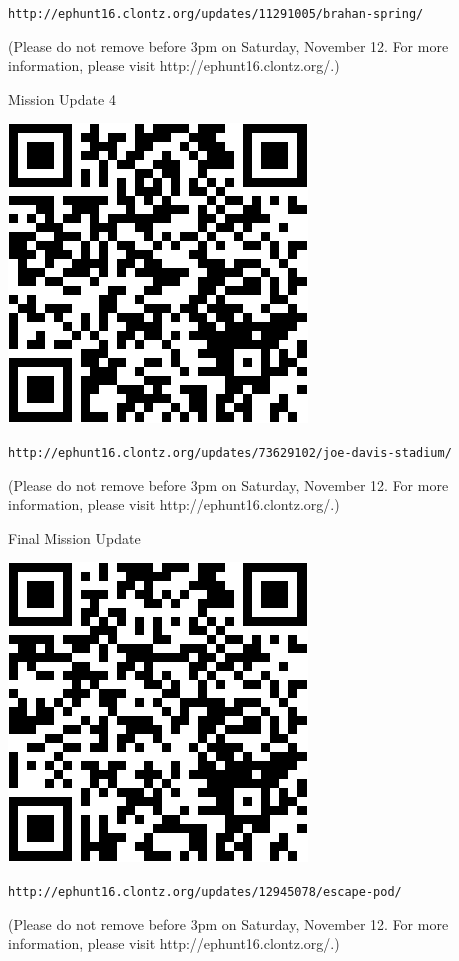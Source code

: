 \documentclass{puzzlehunt}
\begin{document}
\verb|http://ephunt16.clontz.org/updates/11291005/brahan-spring/|

\vfill

{\footnotesize (Please do not remove before 3pm on Saturday, November 12.
For more information, please visit http://ephunt16.clontz.org/.)}




Mission Update 4

\begin{center}
  \includegraphics[width=0.7\linewidth]{qr/joe-davis-stadium.png}
\end{center}

\verb|http://ephunt16.clontz.org/updates/73629102/joe-davis-stadium/|

\vfill

{\footnotesize (Please do not remove before 3pm on Saturday, November 12.
For more information, please visit http://ephunt16.clontz.org/.)}




Final Mission Update

\begin{center}
  \includegraphics[width=0.7\linewidth]{qr/escape-pod.png}
\end{center}

\verb|http://ephunt16.clontz.org/updates/12945078/escape-pod/|

\vfill

{\footnotesize (Please do not remove before 3pm on Saturday, November 12.
For more information, please visit http://ephunt16.clontz.org/.)}
\end{document}
